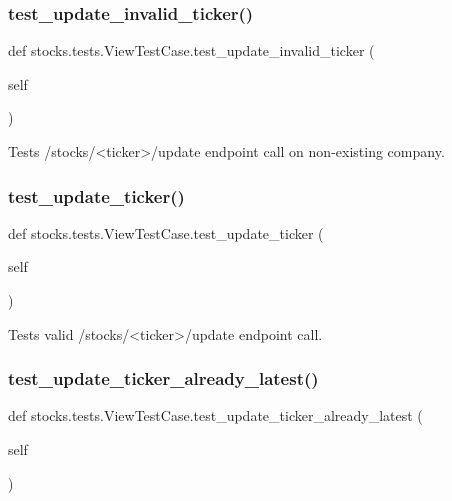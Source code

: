 \subsubsection{\texorpdfstring{test\+\_\+update\+\_\+invalid\+\_\+ticker()}{test\_update\_invalid\_ticker()}}
{\footnotesize\ttfamily def stocks.\+tests.\+View\+Test\+Case.\+test\+\_\+update\+\_\+invalid\+\_\+ticker (\begin{DoxyParamCaption}\item[{}]{self }\end{DoxyParamCaption})}

\begin{DoxyVerb}Tests /stocks/<ticker>/update endpoint call on non-existing company.
\end{DoxyVerb}
 \mbox{\label{classstocks_1_1tests_1_1_view_test_case_a0583f6d1895e7a98e9156fb01ca785a2}} 
\subsubsection{\texorpdfstring{test\+\_\+update\+\_\+ticker()}{test\_update\_ticker()}}
{\footnotesize\ttfamily def stocks.\+tests.\+View\+Test\+Case.\+test\+\_\+update\+\_\+ticker (\begin{DoxyParamCaption}\item[{}]{self }\end{DoxyParamCaption})}

\begin{DoxyVerb}Tests valid /stocks/<ticker>/update endpoint call.
\end{DoxyVerb}
 \mbox{\label{classstocks_1_1tests_1_1_view_test_case_a0794c69e03de1cf85ee490f0bf6be5e2}} 
\subsubsection{\texorpdfstring{test\+\_\+update\+\_\+ticker\+\_\+already\+\_\+latest()}{test\_update\_ticker\_already\_latest()}}
{\footnotesize\ttfamily def stocks.\+tests.\+View\+Test\+Case.\+test\+\_\+update\+\_\+ticker\+\_\+already\+\_\+latest (\begin{DoxyParamCaption}\item[{}]{self }\end{DoxyParamCaption})}

